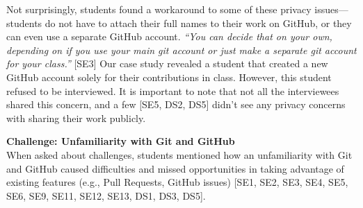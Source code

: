 

Not surprisingly, students found a workaround to some of these privacy issues---students do not have to attach their full names to their work on GitHub, or they can even use a separate GitHub account. \textit{``You can decide that on your own, depending on if you use your main git account or just make a separate git account for your class.''} [SE3] Our case study revealed a student that created a new GitHub account solely for their contributions in class. However, this student refused to be interviewed.
It is important to note that not all the interviewees shared this concern, and a few [SE5, DS2, DS5] didn't see any privacy concerns with sharing their work publicly.


\textbf{Challenge: Unfamiliarity with Git and GitHub}\\
When asked about challenges, students mentioned how an unfamiliarity with Git and GitHub caused difficulties and missed opportunities in taking advantage of existing features (e.g., Pull Requests, GitHub issues) [SE1, SE2, SE3, SE4, SE5, SE6, SE9, SE11, SE12, SE13, DS1, DS3, DS5].

